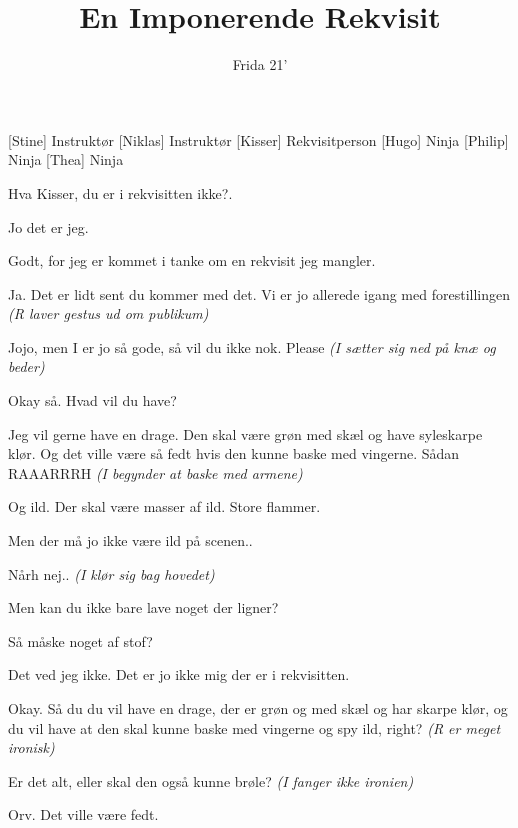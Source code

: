 \documentclass[a4paper,11pt]{article}
\title{En Imponerende Rekvisit}
\author{Frida 21'}
\begin{document}
\maketitle

\begin{roles}
[Stine] Instruktør
[Niklas] Instruktør
[Kisser] Rekvisitperson
[Hugo] Ninja
[Philip] Ninja
[Thea] Ninja
\end{roles}

\begin{sketch}


 Hva Kisser, du er i rekvisitten ikke?. 

 Jo det er jeg. 

 Godt, for jeg er kommet i tanke om en rekvisit jeg mangler.

 Ja. Det er lidt sent du kommer med det. Vi er jo allerede igang med forestillingen \emph{(R laver gestus ud om publikum)}

 Jojo, men I er jo så gode, så vil du ikke nok. Please \emph{(I sætter sig ned på knæ og beder)}

 Okay så. Hvad vil du have?

 Jeg vil gerne have en drage. Den skal være grøn med skæl og have syleskarpe klør. Og det ville være så fedt hvis den kunne baske med vingerne. Sådan RAAARRRH \emph{(I begynder at baske med armene)}

 Og ild. Der skal være masser af ild. Store flammer. 

 Men der må jo ikke være ild på scenen..

 Nårh nej.. \emph{(I klør sig bag hovedet)}

 Men kan du ikke bare lave noget der ligner?

 Så måske noget af stof?

 Det ved jeg ikke. Det er jo ikke mig der er i rekvisitten.

 Okay. Så du du vil have en drage, der er grøn og med skæl og har skarpe klør, og du vil have at den skal kunne baske med vingerne og spy ild, right? \emph{(R er meget ironisk)}

 Er det alt, eller skal den også kunne brøle? \emph{(I fanger ikke ironien)}

 Orv. Det ville være fedt. 


\end{sketch}
\end{document}
